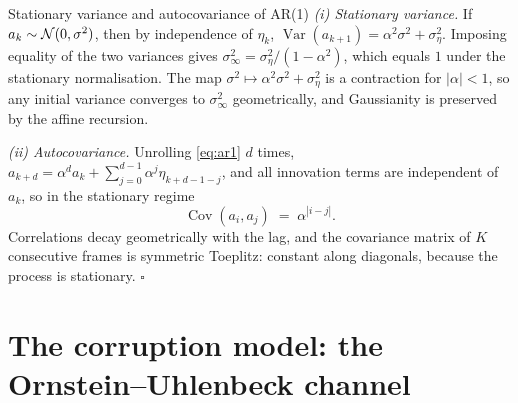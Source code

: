\begin{toolbox}[tb:ar1]{Stationary variance and autocovariance of AR(1)}
\emph{(i) Stationary variance.} If $a_k \sim \mathcal{N}(0, \sigma^2)$, then by
independence of $\eta_k$,
$\operatorname{Var}(a_{k+1}) = \alpha^2 \sigma^2 + \sigma_\eta^2$. Imposing
equality of the two variances gives
$\sigma_\infty^2 = \sigma_\eta^2 / (1 - \alpha^2)$, which equals $1$ under
the stationary normalisation. The map
$\sigma^2 \mapsto \alpha^2\sigma^2 + \sigma_\eta^2$ is a contraction for
$|\alpha| < 1$, so any initial variance converges to $\sigma_\infty^2$
geometrically, and Gaussianity is preserved by the affine recursion.

\emph{(ii) Autocovariance.} Unrolling \eqref{eq:ar1} $d$ times,
$a_{k+d} = \alpha^d a_k + \sum_{j=0}^{d-1} \alpha^{j}\eta_{k+d-1-j}$, and
all innovation terms are independent of $a_k$, so in the stationary regime
\begin{equation*}
  \operatorname{Cov}(a_i, a_j) \;=\; \alpha^{|i-j|} .
\end{equation*}
Correlations decay geometrically with the lag, and the covariance matrix of
$K$ consecutive frames is symmetric Toeplitz: constant along diagonals,
because the process is stationary. \hfill$\square$
\end{toolbox}

\section{The corruption model: the Ornstein--Uhlenbeck channel}
\label{sec:ou}

